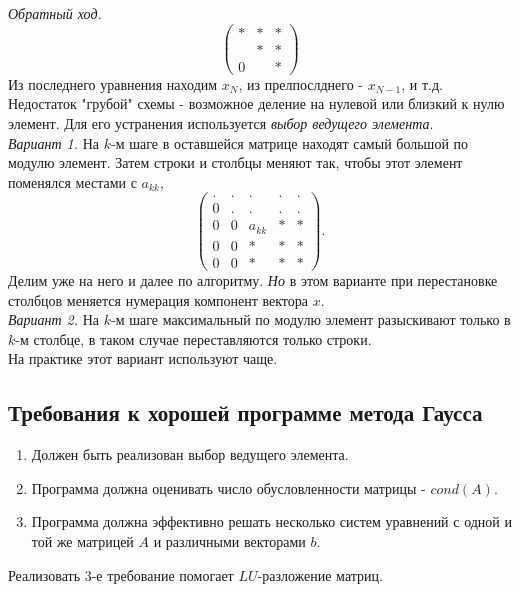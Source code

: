 \documentclass[a4paper,11pt]{article}
\begin{document}
\noindent \textit{Обратный ход.}
\begin{equation*}
  \begin{pmatrix}
    * & * & * \\
      & * & * \\
    0 &   & *
  \end{pmatrix}
\end{equation*}
Из последнего уравнения находим $x_N$, из прелпослднего - $x_{N-1}$, и т.д.\\

Недостаток "грубой" схемы - возможное деление на нулевой или близкий к нулю элемент. Для его устранения используется \textit{выбор ведущего элемента}. \\

\noindent \textit{Вариант 1.} На $k$-м шаге в оставшейся матрице находят самый большой по модулю элемент. Затем строки и столбцы меняют так, чтобы этот элемент поменялся местами с $a_{kk}$,
\begin{equation*}
  \begin{pmatrix}
    . & . & . & . & . \\
    0 & . & . & . & . \\
    0 & 0 & a_{kk} & * & * \\
    0 & 0 & * & * & * \\
    0 & 0 & * & * & *
  \end{pmatrix}.
\end{equation*}
Делим уже на него и далее по алгоритму. \textit{Но} в этом варианте при перестановке столбцов меняется нумерация компонент вектора $x$. \\

\noindent \textit{Вариант 2.} На $k$-м шаге максимальный по модулю элемент разыскивают только в $k$-м столбце, в таком случае переставляются только строки. \\
На практике этот вариант используют чаще.

\subsection{Требования к хорошей программе метода Гаусса}
\begin{enumerate}
  \item Должен быть реализован выбор ведущего элемента.
  \item Программа должна оценивать число обусловленности матрицы - $cond(A)$.
  \item Программа должна эффективно решать несколько систем уравнений с одной и той же матрицей $A$ и различными векторами $b$.
\end{enumerate}
Реализовать 3-е требование помогает $LU$-разложение матриц.
\end{document}
